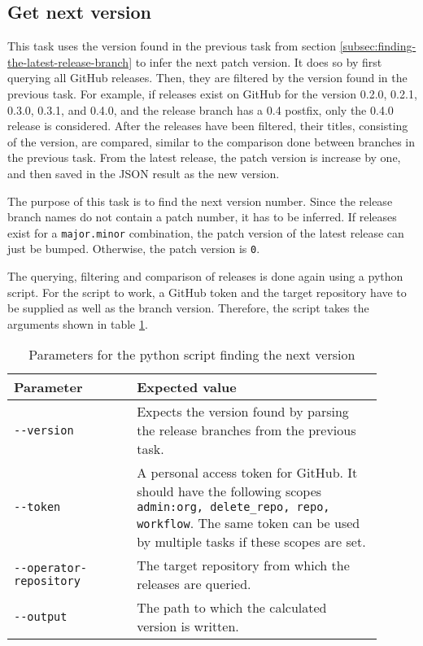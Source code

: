 \subsection{Get next version}\label{subsec:get-next-version}

This task uses the version found in the previous task from section \ref{subsec:finding-the-latest-release-branch} to infer the next patch version.
It does so by first querying all GitHub releases.
Then, they are filtered by the version found in the previous task.
For example, if releases exist on GitHub for the version 0.2.0, 0.2.1, 0.3.0, 0.3.1, and 0.4.0, and the release branch has a 0.4 postfix, only the 0.4.0 release is considered.
After the releases have been filtered, their titles, consisting of the version, are compared, similar to the comparison done between branches in the previous task.
From the latest release, the patch version is increase by one, and then saved in the JSON result as the new version.

The purpose of this task is to find the next version number.
Since the release branch names do not contain a patch number, it has to be inferred.
If releases exist for a \verb|major.minor| combination, the patch version of the latest release can just be bumped.
Otherwise, the patch version is \verb|0|.

The querying, filtering and comparison of releases is done again using a python script.
For the script to work, a GitHub token and the target repository have to be supplied as well as the branch version.
Therefore, the script takes the arguments shown in table \ref{tab:py-finding-the-next-version}.

\begin{table}[H]
    \centering
    \caption{Parameters for the python script finding the next version}
    \label{tab:py-finding-the-next-version}
    \begin{tabular}{p{0.3\linewidth}|p{0.6\linewidth}}
        Parameter & Expected value \\
        \hline
        \verb|--version| & Expects the version found by parsing the release branches from the previous task.  \\
        \verb|--token| &  A personal access token for GitHub.
            It should have the following scopes \verb|admin:org, delete_repo, repo, workflow|.
            The same token can be used by multiple tasks if these scopes are set. \\
        \verb|--operator-repository| & The target repository from which the releases are queried. \\
        \verb|--output| & The path to which the calculated version is written. \\
    \end{tabular}
\end{table}

